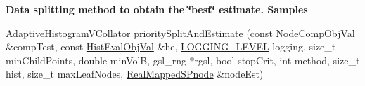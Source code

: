 \begin{Indent}{\bf \-Data splitting method to obtain the \char`\"{}best\char`\"{} estimate. \-Samples}
\begin{DoxyCompactItemize}
\item 
\hyperlink{classsubpavings_1_1AdaptiveHistogramVCollator}{\-Adaptive\-Histogram\-V\-Collator} \hyperlink{classsubpavings_1_1AdaptiveHistogramValidation_ab38050780c66024e0c278789b37e25ed}{priority\-Split\-And\-Estimate} (const \hyperlink{classsubpavings_1_1NodeCompObjVal}{\-Node\-Comp\-Obj\-Val} \&comp\-Test, const \hyperlink{classsubpavings_1_1HistEvalObjVal}{\-Hist\-Eval\-Obj\-Val} \&he, \hyperlink{namespacesubpavings_aef8e51096b59ecaf1a1e9b2ee24b6089}{\-L\-O\-G\-G\-I\-N\-G\-\_\-\-L\-E\-V\-E\-L} logging, size\-\_\-t min\-Child\-Points, double min\-Vol\-B, gsl\-\_\-rng $\ast$rgsl, bool stop\-Crit, int method, size\-\_\-t hist, size\-\_\-t max\-Leaf\-Nodes, \hyperlink{classsubpavings_1_1RealMappedSPnode}{\-Real\-Mapped\-S\-Pnode} \&node\-Est)
\end{DoxyCompactItemize}
\end{Indent}
